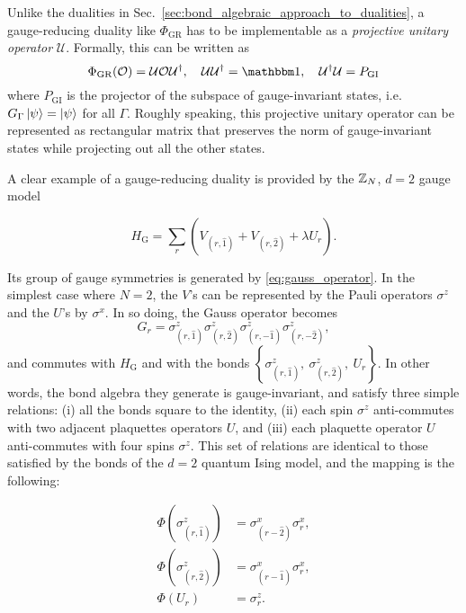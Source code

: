 Unlike the dualities in Sec.~\ref{sec:bond_algebraic_approach_to_dualities}, a gauge-reducing duality like $\Phi_{\text{GR}}$ has to be implementable as a \emph{projective unitary operator} $\mathcal{U}$.
Formally, this can be written as
\begin{equation}
    \Phi_{\text{GR}} ( \mathcal{O} ) = \mathcal{U} \mathcal{O} \mathcal{U}^\dagger, \quad
    \mathcal{U} \mathcal{U}^\dagger = \One, \quad
    \mathcal{U}^\dagger \mathcal{U} = P_{\text{GI}}
\end{equation}
where $P_{\text{GI}}$ is the projector of the subspace of gauge-invariant states, i.e.~$G_{\Gamma} \ket{\psi} = \ket{\psi}$ for all $\Gamma$.
Roughly speaking, this projective unitary operator can be represented as rectangular matrix that preserves the norm of gauge-invariant states while projecting out all the other states.

A clear example of a gauge-reducing duality is provided by the $\mathbb{Z}_N$, $d=2$ gauge model

\begin{equation}
	H_{\text{G}} = \sum_r \left( V_{(r,\hat{1})} + V_{(r,\hat{2})} + \lambda U_r \right).
\end{equation}

Its group of gauge symmetries is generated by \eqref{eq:gauss_operator}. In the simplest case where $N=2$, the $V$'s can be represented by the Pauli operators $\sigma^z$ and the $U$'s by $\sigma^x$. In so doing, the Gauss operator becomes
\begin{equation}
	G_r =
	\sigma^z_{(r, \hat{1})}
	\sigma^z_{(r, \hat{2})}
	\sigma^z_{(r, -\hat{1})}
	\sigma^z_{(r, -\hat{2})},
	\label{eq:gauss_operator_Z2}
\end{equation}
and commutes with $H_{\text{G}}$ and with the bonds $\left\{\sigma^z_{(r,\hat{1})},\ \sigma^z_{(r,\hat{2})},\ U_r\right\} $.
In other words, the bond algebra they generate is gauge-invariant, and satisfy three simple relations: (i) all the bonds square to the identity, (ii) each spin $\sigma^z$ anti-commutes with two adjacent plaquettes operators $U$, and (iii) each plaquette operator $U$ anti-commutes with four spins $\sigma^z$.
This set of relations are identical to those satisfied by the bonds of the $d=2$ quantum Ising model, and the mapping is the following:

\begin{equation}
    \begin{split}
        \Phi\left( \sigma^z_{(r,\hat{1})} \right) & = \sigma^x_{(r-\hat{2})} \sigma^x_r, \\
        \Phi\left( \sigma^z_{(r,\hat{2})} \right) & = \sigma^x_{(r-\hat{1})} \sigma^x_r, \\
        \Phi(U_r) & = \sigma^z_r.
    \end{split}
    \label{eq:duality_2d}
\end{equation}


